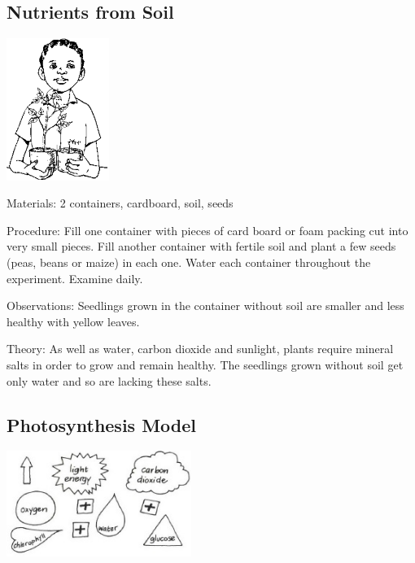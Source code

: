 \begin{multicols}{2}
\subsection{Nutrients from Soil} %

\begin{center}
\includegraphics[width=0.25\textwidth]{./img/source/nutrients-plants.png}
\end{center}

\begin{description*}
\item[Materials:]{2 containers, cardboard, soil, seeds}
\item[Procedure:]{Fill one container with pieces of card board or foam packing cut
into very small pieces. Fill another container with fertile soil and plant a few seeds (peas,
beans or maize) in each one. Water each container throughout the experiment. Examine daily.}
\item[Observations:]{Seedlings grown in the container without soil are smaller and less healthy with yellow leaves.}
\item[Theory:]{As well as water, carbon dioxide and sunlight, plants require mineral salts in order to grow
and remain healthy. The seedlings grown without soil get only water and so are lacking these
salts.}
\end{description*}

\subsection{Photosynthesis Model}  %

\begin{center}
\includegraphics[width=0.45\textwidth]{./img/vso/photo-model.jpg}
\end{center}


\end{multicols}
